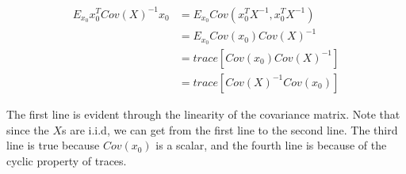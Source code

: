 {\begin{align}
E_{x_0}x_0^TCov(X)^{-1}x_0 & = E_{x_0}Cov(x_0^TX^{-1}, x_0^TX^{-1}) \\
                           & = E_{x_0}Cov(x_0)Cov(X)^{-1} \\
                           & = trace[Cov(x_0)Cov(X)^{-1}] \\
                           & = trace[Cov(X)^{-1}Cov(x_0)]
\end{align}

The first line is evident through the linearity of the covariance matrix.
Note that since the $X$s are i.i.d, we can get from the first line to the
second line. The third line is true because $Cov(x_0)$ is a scalar, and
the fourth line is because of the cyclic property of traces.

}

\exerciseshere
